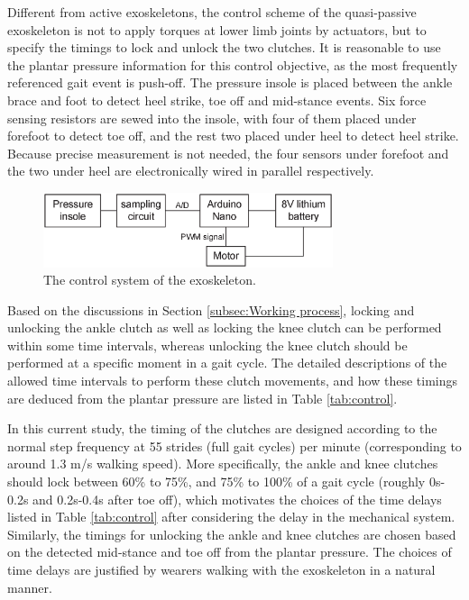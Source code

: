 \documentclass[twocolumn,cleanfoot,10pt]{asme2ej}
\begin{document}
Different from active exoskeletons, the control scheme of the quasi-passive exoskeleton is not to apply torques at lower limb joints by actuators, but to specify the timings to lock and unlock the two clutches.
It is reasonable to use the plantar pressure information for this control objective, as the most frequently referenced gait event is push-off.
The pressure insole is placed between the ankle brace and foot to detect heel strike, toe off and mid-stance events.
Six force sensing resistors are sewed into the insole, with four of them placed under forefoot to detect toe off, and the rest two placed under heel to detect heel strike.
Because precise measurement is not needed, the four sensors under forefoot and the two under heel are electronically wired in parallel respectively. 

\begin{figure}[t]
	\centering
	\includegraphics[width=8.5cm]{control.eps}
	\caption{The control system of the exoskeleton.}
	\label{fig:control}   
\end{figure}

Based on the discussions in Section \ref{subsec:Working process}, locking and unlocking the ankle clutch as well as locking the knee clutch can be performed within some time intervals, whereas unlocking the knee clutch should be performed at a specific moment in a gait cycle.
The detailed descriptions of the allowed time intervals to perform these clutch movements, and how these timings are deduced from the plantar pressure are listed in Table \ref{tab:control}.

In this current study, the timing of the clutches are designed according to the normal step frequency at 55 strides (full gait cycles) per minute (corresponding to around 1.3 m/s walking speed).
More specifically, the ankle and knee clutches should lock between 60\% to 75\%, and 75\% to 100\% of a gait cycle (roughly 0s-0.2s and 0.2s-0.4s after toe off), which motivates the choices of the time delays listed in Table \ref{tab:control} after considering the delay in the mechanical system.
Similarly, the timings for unlocking the ankle and knee clutches are chosen based on the detected mid-stance and toe off from the plantar pressure.
The choices of time delays are justified by wearers walking with the exoskeleton in a natural manner.
\end{document}
